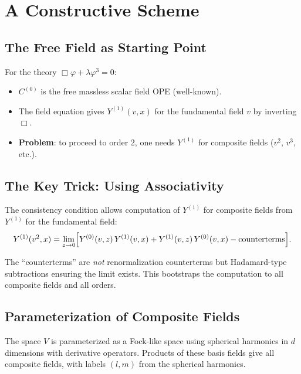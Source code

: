 \documentclass[11pt,a4paper]{article}
\begin{document}
\section{A Constructive Scheme}

\subsection{The Free Field as Starting Point}

For the theory $\Box\varphi + \lambda\varphi^3 = 0$:
\begin{itemize}[nosep]
  \item $C^{(0)}$ is the free massless scalar field OPE (well-known).
  \item The field equation gives $Y^{(1)}(v, x)$ for the fundamental field $v$
        by inverting $\Box$.
  \item \textbf{Problem}: to proceed to order 2, one needs $Y^{(1)}$ for
        composite fields ($v^2$, $v^3$, etc.).
\end{itemize}

\subsection{The Key Trick: Using Associativity}

The consistency condition allows computation of $Y^{(1)}$ for composite
fields from $Y^{(1)}$ for the fundamental field:
\begin{equation}
  Y^{(1)}(v^2, x) = \lim_{z \to 0} \Bigl[
  Y^{(0)}(v, z)\, Y^{(1)}(v, x) + Y^{(1)}(v, z)\, Y^{(0)}(v, x)
  - \text{counterterms} \Bigr].
\end{equation}

The ``counterterms'' are \emph{not} renormalization counterterms but
Hadamard-type subtractions ensuring the limit exists. This bootstraps
the computation to all composite fields and all orders.

\subsection{Parameterization of Composite Fields}

The space $V$ is parameterized as a Fock-like space using spherical
harmonics in $d$ dimensions with derivative operators. Products of
these basis fields give all composite fields, with labels $(l,m)$
from the spherical harmonics.
\end{document}
